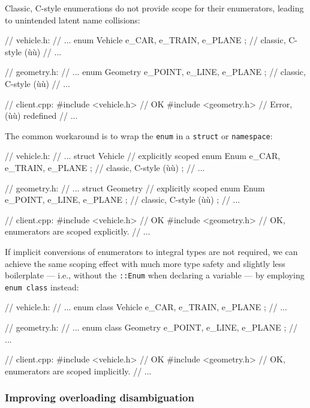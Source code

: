 Classic, C-style enumerations do not provide scope for their
enumerators, leading to unintended latent name collisions:

\begin{emcppslisting}
// vehicle.h:
// ...
enum Vehicle  { e_CAR, e_TRAIN, e_PLANE };  // classic, C-style (ù{}ù)
// ...

// geometry.h:
// ...
enum Geometry { e_POINT, e_LINE,  e_PLANE };  // classic, C-style (ù{}ù)
// ...

// client.cpp:
#include <vehicle.h>  // OK
#include <geometry.h> // Error, (ù{}ù) redefined
// ...
\end{emcppslisting}

\noindent The common workaround is to wrap the \texttt{enum} in a \texttt{struct}
or \texttt{namespace}:

\begin{emcppslisting}
// vehicle.h:
// ...
struct Vehicle {                            // explicitly scoped
    enum Enum { e_CAR, e_TRAIN, e_PLANE };  // classic, C-style (ù{}ù)
};
// ...

// geometry.h:
// ...
struct Geometry {                            // explicitly scoped
    enum Enum { e_POINT, e_LINE, e_PLANE };  // classic, C-style (ù{}ù)
};
// ...

// client.cpp:
#include <vehicle.h>    // OK
#include <geometry.h>   // OK, enumerators are scoped explicitly.
// ...
\end{emcppslisting}

\noindent If implicit conversions of enumerators to integral types are not
required, we can achieve the same scoping effect with much more type
safety and slightly less boilerplate --- i.e., without the
\texttt{::Enum} when declaring a variable --- by employing
\texttt{enum}~\texttt{class} instead:

\begin{emcppslisting}
// vehicle.h:
// ...
enum class Vehicle { e_CAR, e_TRAIN, e_PLANE };
// ...

// geometry.h:
// ...
enum class Geometry { e_POINT, e_LINE, e_PLANE };
// ...

// client.cpp:
#include <vehicle.h>  // OK
#include <geometry.h>   // OK, enumerators are scoped implicitly.
// ...
\end{emcppslisting}

\subsubsection[Improving overloading disambiguation]{Improving overloading disambiguation}\label{improving-overloading-disambiguation}

